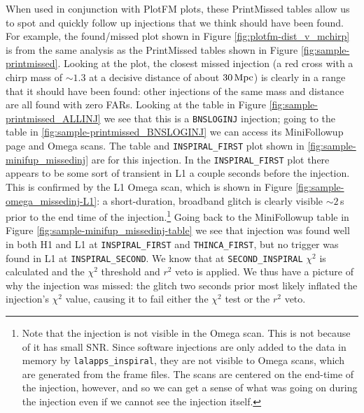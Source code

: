 When used in conjunction with PlotFM plots, these PrintMissed tables allow us to spot and quickly follow up injections that we think should have been found. For example, the found/missed plot shown in Figure \ref{fig:plotfm-dist_v_mchirp} is from the same analysis as the PrintMissed tables shown in Figure \ref{fig:sample-printmissed}. Looking at the plot, the closest missed injection (a red cross with a chirp mass of $\sim1.3$ at a decisive distance of about $30\,\mathrm{Mpc}$) is clearly in a range that it should have been found: other injections of the same mass and distance are all found with zero \acp{FAR}. Looking at the table in Figure \ref{fig:sample-printmissed_ALLINJ} we see that this is a \verb|BNSLOGINJ| injection; going to the table in \ref{fig:sample-printmissed_BNSLOGINJ} we can access its MiniFollowup page and Omega scans. The table and \verb|INSPIRAL_FIRST| plot shown in \ref{fig:sample-minifup_missedinj} are for this injection. In the \verb|INSPIRAL_FIRST| plot there appears to be some sort of transient in L1 a couple seconds before the injection. This is confirmed by the L1 Omega scan, which is shown in Figure \ref{fig:sample-omega_missedinj-L1}: a short-duration, broadband glitch is clearly visible $\sim2\,$s prior to the end time of the injection.\footnote{Note that the injection is not visible in the Omega scan. This is not because of it has small \ac{SNR}. Since software injections are only added to the data in memory by \texttt{lalapps\_inspiral}, they are not visible to Omega scans, which are generated from the frame files. The scans are centered on the end-time of the injection, however, and so we can get a sense of what was going on during the injection even if we cannot see the injection itself.} Going back to the MiniFollowup table in Figure \ref{fig:sample-minifup_missedinj-table} we see that injection was found well in both H1 and L1 at \verb|INSPIRAL_FIRST| and \verb|THINCA_FIRST|, but no trigger was found in L1 at \verb|INSPIRAL_SECOND|. We know that at \verb|SECOND_INSPIRAL| $\chi^2$ is calculated and the $\chi^2$ threshold and $r^2$ veto is applied. We thus have a picture of why the injection was missed: the glitch two seconds prior most likely inflated the injection's $\chi^2$ value, causing it to fail either the $\chi^2$ test or the $r^2$ veto. 

